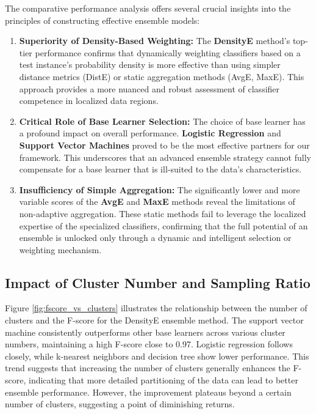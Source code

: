 \documentclass[lettersize,journal]{IEEEtran}
\begin{document}
	The comparative performance analysis offers several crucial insights into the principles of constructing effective ensemble models:
	
	\begin{enumerate}
		\item \textbf{Superiority of Density-Based Weighting:} The \textbf{DensityE} method's top-tier performance confirms that dynamically weighting classifiers based on a test instance's probability density is more effective than using simpler distance metrics (DistE) or static aggregation methods (AvgE, MaxE). This approach provides a more nuanced and robust assessment of classifier competence in localized data regions.
		
		\item \textbf{Critical Role of Base Learner Selection:} The choice of base learner has a profound impact on overall performance. \textbf{Logistic Regression} and \textbf{Support Vector Machines} proved to be the most effective partners for our framework. This underscores that an advanced ensemble strategy cannot fully compensate for a base learner that is ill-suited to the data's characteristics.
		
		\item \textbf{Insufficiency of Simple Aggregation:} The significantly lower and more variable scores of the \textbf{AvgE} and \textbf{MaxE} methods reveal the limitations of non-adaptive aggregation. These static methods fail to leverage the localized expertise of the specialized classifiers, confirming that the full potential of an ensemble is unlocked only through a dynamic and intelligent selection or weighting mechanism.
	\end{enumerate}
	
	\subsection{Impact of Cluster Number and Sampling Ratio}
	
	\noindent Figure \ref{fig:fscore_vs_clusters} illustrates the relationship between the number of clusters and
	the F-score for the DensityE ensemble method. The support vector machine
	consistently outperforms other base learners across various cluster numbers,
	maintaining a high F-score close to 0.97. Logistic regression follows closely,
	while k-nearest neighbors and decision tree show lower performance. This
	trend suggests that increasing the number of clusters generally enhances the
	F-score, indicating that more detailed partitioning of the data can lead to
	better ensemble performance. However, the improvement plateaus beyond a
	certain number of clusters, suggesting a point of diminishing returns.
	
\end{document}
